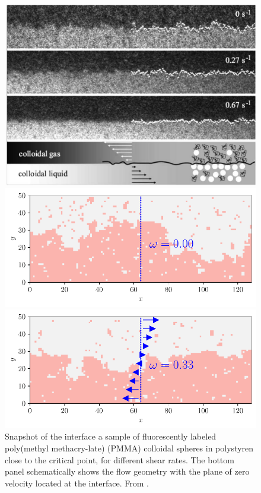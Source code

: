 \begin{figure}
    \centering
    \includegraphics[width=0.7\linewidth]{int-dyn/derks.png}
    \caption{Snapshot of the interface a sample of fluorescently labeled poly(methyl methacry-late) (PMMA) colloidal spheres in polystyren close to the critical point, for different shear rates. The bottom panel schematically shows the flow geometry with the plane of zero velocity located at the interface. From \cite{derks_suppression_2006}. }
    \label{snap-derks-shear}
    \vspace*{\floatsep}
	\begin{minipage}[t]{0.5\linewidth}
		\includegraphics[width=\linewidth]{intro/cis-ising-f-000.pdf}
	\end{minipage}%
	\begin{minipage}[t]{0.5\linewidth}
		\includegraphics[width=\linewidth]{intro/cis-ising-f-033.pdf}

\end{minipage}
\end{figure}
